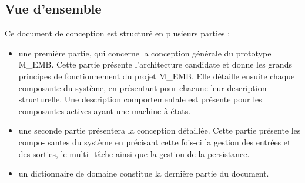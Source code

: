 \newpage
\subsection{Vue d'ensemble} %

Ce document de conception est structuré en plusieurs parties :
\begin{itemize}
    \item une première partie, qui concerne la conception générale du prototype \gls{M_EMB}. Cette partie présente l'architecture candidate et donne les grands principes de fonctionnement
    du projet \gls{M_EMB}. Elle détaille ensuite chaque composante du système, en présentant
    pour chacune leur description structurelle. Une description comportementale est présente
    pour les composantes actives ayant une machine à états.
    \item une seconde partie présentera la conception détaillée. Cette partie présente les compo-
    santes du système en précisant cette fois-ci la gestion des entrées et des sorties, le multi-
    tâche ainsi que la gestion de la persistance.
    \item un dictionnaire de domaine constitue la dernière partie du document.
\end{itemize}